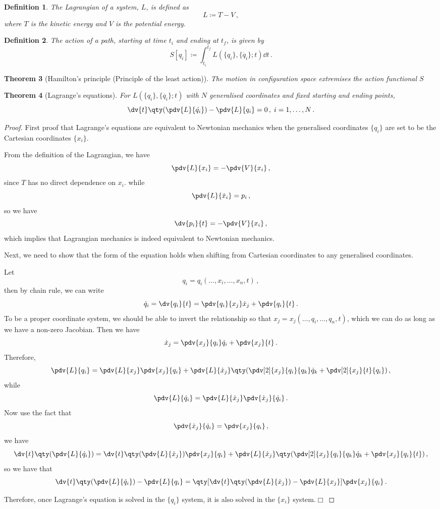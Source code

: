 \documentclass{article}
\theoremstyle{plain}\theoremheaderfont{\normalfont\itshape}\theorembodyfont{\rmfamily}\theoremseparator{.}\newtheorem*{rem}{Remark}\newtheorem*{ex}{Example}\newtheorem*{proof}{Proof}\newtheorem*{altp}{Alternative proof}
\theoremstyle{plain}\theoremheaderfont{\normalfont\bfseries}\theorembodyfont{\rmfamily}\theoremseparator{.}\newtheorem{thm}{Theorem}[section]\newtheorem{lem}[thm]{Lemma}\newtheorem{prop}[thm]{Proposition}\newtheorem*{cor}{Corollary}\newtheorem{defn}[thm]{Definition}\newtheorem{clm}[thm]{Claim}\newtheorem{clminproof}{Claim}
\theoremstyle{break}\theoremheaderfont{\normalfont\itshape}\theorembodyfont{\rmfamily}\theoremseparator{.\medskip}\newtheorem*{proofskip}{Proof}\newtheorem*{exs}{Examples}\newtheorem*{rems}{Remarks}
\theoremstyle{break}\theoremheaderfont{\normalfont\bfseries}\theorembodyfont{\rmfamily}\theoremseparator{.\medskip}\newtheorem{lemskip}[thm]{Lemma}\newtheorem{defnskip}[thm]{Definition}\newtheorem{propskip}[thm]{Proposition}\newtheorem{thmskip}[thm]{Theorem}
\numberwithin{equation}{section}
\newcommand{\qed}{\hfill\ensuremath{\Box}}
\begin{document}
	\begin{defn}
		The \textit{Lagrangian} of a system, \(L\), is defined as
		\[L\coloneqq T-V\,,\]
		where \(T\) is the kinetic energy and \(V\) is the potential energy.
	\end{defn}
	\begin{defn}
		The \textit{action} of a path, starting at time \(t_i\) and ending at \(t_f\), is given by
		\[S[{q_i}]\coloneqq\int_{t_i}^{t_f}L(\{q_i\},\{\dot{q_i}\};t)\dd{t}\,.\]
	\end{defn}
	\begin{thm}[Hamilton's principle (Principle of the least action)]	
		The motion in configuration space extremises the action functional \(S\)
	\end{thm}
	\begin{thm}[Lagrange's equations]\label{lageq}
		For \(L(\{q_i\},\{\dot{q_i}\};t)\) with \(N\) generalised coordinates and fixed starting and ending points,
		\[\dv{t}\qty(\pdv{L}{\dot{q_i}})-\pdv{L}{q_i}=0\,,\;i=1,\dots,N\,.\]
	\end{thm}
	\begin{proof}
		First proof that Lagrange's equations are equivalent to Newtonian mechanics when the generalised coordinates \(\{q_i\}\) are set to be the Cartesian coordinates \(\{x_i\}\).

		From the definition of the Lagrangian, we have
		\[\pdv{L}{x_i}=-\pdv{V}{x_i}\,,\]
		since \(T\) has no direct dependence on \(x_i\). while
		\[\pdv{L}{\dot{x}_i}=p_i\,,\]
		so we have
		\[\dv{p_i}{t}=-\pdv{V}{x_i}\,,\]
		which implies that Lagrangian mechanics is indeed equivalent to Newtonian mechanics.

		Next, we need to show that the form of the equation holds when shifting from Cartesian coordinates to any generalised coordinates.

		Let
		\[q_i=q_i(\dots,x_i,\dots,x_n,t)\,,\]
		then by chain rule, we can write
		\[\dot{q}_i=\dv{q_i}{t}=\pdv{q_i}{x_j}\dot{x}_j+\pdv{q_i}{t}\,.\]
		To be a proper coordinate system, we should be able to invert the relationship so that \(x_j=x_j(\dots,q_i,\dots,q_n,t)\), which we can do as long as we have a non-zero Jacobian. Then we have
		\[\dot{x}_j=\pdv{x_j}{q_i}\dot{q}_i+\pdv{x_j}{t}\,.\]
		Therefore,
		\[\pdv{L}{q_i}=\pdv{L}{x_j}\pdv{x_j}{q_i}+\pdv{L}{\dot{x}_j}\qty(\pdv[2]{x_j}{q_i}{q_k}\dot{q}_k+\pdv[2]{x_j}{t}{q_i})\,,\]
		while
		\[\pdv{L}{\dot{q}_i}=\pdv{L}{\dot{x}_j}\pdv{\dot{x}_j}{\dot{q}_i}\,.\]
		Now use the fact that
		\[\pdv{\dot{x}_j}{\dot{q}_i}=\pdv{x_j}{q_i}\,,\]
		we have
		\[\dv{t}\qty(\pdv{L}{\dot{q}_i})=\dv{t}\qty(\pdv{L}{\dot{x}_j})\pdv{x_j}{q_i}+\pdv{L}{\dot{x}_j}\qty(\pdv[2]{x_j}{q_i}{q_k}\dot{q}_k+\pdv{x_j}{q_i}{t})\,,\]
		so we have that
		\[\dv{t}\qty(\pdv{L}{\dot{q}_i})-\pdv{L}{q_i}=\qty[\dv{t}\qty(\pdv{L}{\dot{x}_j})-\pdv{L}{x_j}]\pdv{x_j}{q_i}\,.\]

		Therefore, once Lagrange's equation is solved in the \(\{q_i\}\) system, it is also solved in the \(\{x_i\}\) system.\qed
	\end{proof}
\end{document}

